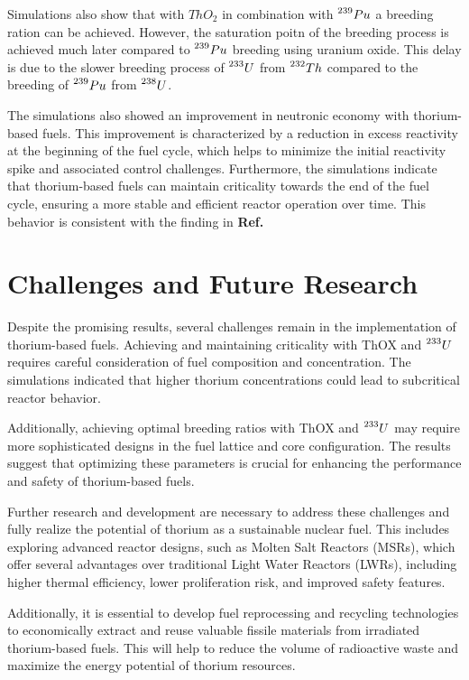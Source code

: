 Simulations also show that with \(ThO_2\) in combination with \(\prescript{239}{}{Pu}\) a breeding ration can be achieved. However, the saturation poitn of the breeding process is achieved much later compared to \(\prescript{239}{}{Pu}\) breeding using uranium oxide. This delay is due to the slower breeding process of \(\prescript{233}{}{U}\) from \(\prescript{232}{}{Th}\) compared to the breeding of \(\prescript{239}{}{Pu}\) from \(\prescript{238}{}{U}\).

The simulations also showed an improvement in neutronic economy with thorium-based fuels. This improvement is characterized by a reduction in excess reactivity at the beginning of the fuel cycle, which helps to minimize the initial reactivity spike and associated control challenges. Furthermore, the simulations indicate that thorium-based fuels can maintain criticality towards the end of the fuel cycle, ensuring a more stable and efficient reactor operation over time. This behavior is consistent with the finding in \textbf{Ref.}\cite{LAU201248}

\section{Challenges and Future Research}

Despite the promising results, several challenges remain in the implementation of thorium-based fuels. Achieving and maintaining criticality with ThOX and \(\prescript{233}{}{U}\) requires careful consideration of fuel composition and concentration. The simulations indicated that higher thorium concentrations could lead to subcritical reactor behavior.

Additionally, achieving optimal breeding ratios with ThOX and \(\prescript{233}{}{U}\) may require more sophisticated designs in the fuel lattice and core configuration. The results suggest that optimizing these parameters is crucial for enhancing the performance and safety of thorium-based fuels.

Further research and development are necessary to address these challenges and fully realize the potential of thorium as a sustainable nuclear fuel. This includes exploring advanced reactor designs, such as Molten Salt Reactors (MSRs), which offer several advantages over traditional Light Water Reactors (LWRs), including higher thermal efficiency, lower proliferation risk, and improved safety features.

Additionally, it is essential to develop fuel reprocessing and recycling technologies to economically extract and reuse valuable fissile materials from irradiated thorium-based fuels. This will help to reduce the volume of radioactive waste and maximize the energy potential of thorium resources.

